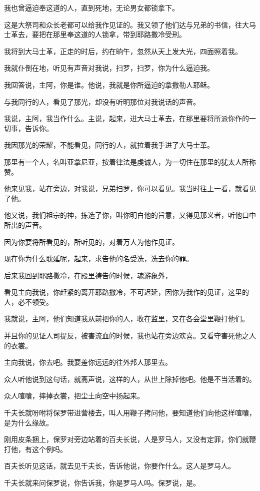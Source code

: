 \documentclass[12pt,oneside]{book}
\begin{document}
我也曾逼迫奉这道的人，直到死地，无论男女都锁拿下。

这是大祭司和众长老都可以给我作见证的。我又领了他们达与兄弟的书信，往大马士革去，要把在那里奉这道的人锁拿，带到耶路撒冷受刑。

我将到大马士革，正走的时后，约在晌午，忽然从天上发大光，四面照着我。

我就仆倒在地，听见有声音对我说，扫罗，扫罗，你为什么逼迫我。

我回答说，主阿，你是谁。他说，我就是你所逼迫的拿撒勒人耶稣。

与我同行的人，看见了那光，却没有听明那位对我说话的声音。

我说，主阿，我当作什么。主说，起来，进大马士革去，在那里要将所派你作的一切事，告诉你。

我因那光的荣耀，不能看见，同行的人，就拉着我手进了大马士革。

那里有一个人，名叫亚拿尼亚，按着律法是虔诚人，为一切住在那里的犹太人所称赞。

他来见我，站在旁边，对我说，兄弟扫罗，你可以看见。我当时往上一看，就看见了他。

他又说，我们祖宗的神，拣选了你，叫你明白他的旨意，又得见那义者，听他口中所出的声音。

因为你要将所看见的，所听见的，对着万人为他作见证。

现在你为什么耽延呢，起来，求告他的名受洗，洗去你的罪。

后来我回到耶路撒冷，在殿里祷告的时候，魂游象外，

看见主向我说，你赶紧的离开耶路撒冷，不可迟延，因你为我作的见证，这里的人，必不领受。

我就说，主阿，他们知道我从前把你的人，收在监里，又在各会堂里鞭打他们。

并且你的见证人司提反，被害流血的时候，我也站在旁边欢喜。又看守害死他之人的衣裳。

主向我说，你去吧。我要差你远远的往外邦人那里去。

众人听他说到这句话，就高声说，这样的人，从世上除掉他吧。他是不当活着的。

众人喧囔，摔掉衣裳，把尘土向空中扬起来。

千夫长就吩咐将保罗带进营楼去，叫人用鞭子拷问他，要知道他们向他这样喧囔，是为什么缘故。

刚用皮条捆上，保罗对旁边站着的百夫长说，人是罗马人，又没有定罪，你们就鞭打他，有这个例吗。

百夫长听见这话，就去见千夫长，告诉他说，你要作什么。这人是罗马人。

千夫长就来问保罗说，你告诉我，你是罗马人吗。保罗说，是。
\end{document}
